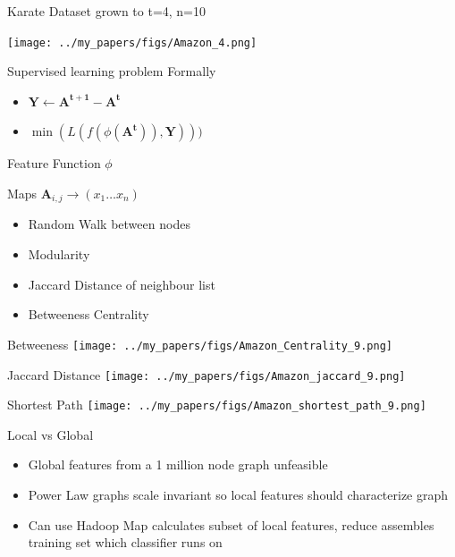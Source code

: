 \documentclass{beamer}
\begin{document}
\begin{frame}{Karate Dataset grown to t=4, n=10}

\texttt{[image: ../my\_papers/figs/Amazon\_4.png]}
  
\end{frame}

\begin{frame}{Supervised learning problem}
Formally
  \begin{itemize}
	\item $ \mathbf{Y}\leftarrow \mathbf{A^{t+1} }- \mathbf{A^t} $ 
	\pause
	\item $ \min(L ( f(\phi(\mathbf{A^t})) , \mathbf{Y})))$
	\pause
  \end{itemize}
\end{frame}

\begin{frame}{Feature Function $\phi$}

Maps $\mathbf{A}_{i,j} \rightarrow (x_1 \dots x_n)$  

  \begin{itemize}
	\item Random Walk between nodes
	\pause
	\item Modularity
	\pause
	\item Jaccard Distance of neighbour list
	\pause
	\item Betweeness Centrality
  \end{itemize}
\end{frame}

\begin{frame}{Betweeness}
\texttt{[image: ../my\_papers/figs/Amazon\_Centrality\_9.png]}
\end{frame}

\begin{frame}{Jaccard Distance}
\texttt{[image: ../my\_papers/figs/Amazon\_jaccard\_9.png]}
\end{frame}

\begin{frame}{Shortest Path}
\texttt{[image: ../my\_papers/figs/Amazon\_shortest\_path\_9.png]}
\end{frame}

\begin{frame}{Local vs Global}

  \begin{itemize}
	\item Global features from a 1 million node graph unfeasible  
	\pause
	\item Power Law graphs scale invariant so local features should characterize graph 
	\pause
	\item Can use Hadoop Map calculates subset of local features, reduce assembles training set which classifier runs on 
  \end{itemize}
\end{frame}
\end{document}
